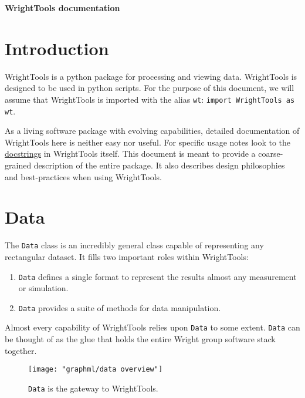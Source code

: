 \documentclass[11pt]{article}
\begin{document}
\begin{flushleft}
	{\Huge \textbf{WrightTools documentation}}
\end{flushleft}

{\let\newpage\relax\begin{spacing}{0.1}\tableofcontents\end{spacing}}
\pagebreak
\listoftodos
\pagebreak

\section{Introduction}

WrightTools is a python package for processing and viewing data. WrightTools is designed to be used in python scripts. For the purpose of this document, we will assume that WrightTools is imported with the alias \texttt{wt}: \texttt{import WrightTools as wt}.


As a living software package with evolving capabilities, detailed documentation of WrightTools here is neither easy nor useful. For specific usage notes look to the \href{https://www.python.org/dev/peps/pep-0257/#what-is-a-docstring}{docstrings} in WrightTools itself. This document is meant to provide a coarse-grained description of the entire package. It also describes design philosophies and best-practices when using WrightTools.

\pagebreak
\section{Data}

The \texttt{Data} class is an incredibly general class capable of representing any rectangular dataset. It fills two important roles within WrightTools:
\begin{enumerate}
	\item \texttt{Data} defines a single format to represent the results almost any measurement or simulation.
	\item \texttt{Data} provides a suite of methods for data manipulation.
\end{enumerate}
Almost every capability of WrightTools relies upon \texttt{Data} to some extent. \texttt{Data} can be thought of as the glue that holds the entire Wright group software stack together.

\begin{figure}[h]\label{fig:data overview}
	\begin{centering}
		\texttt{[image: "graphml/data overview"]}
		\caption{\texttt{Data} is the gateway to WrightTools.}
	\end{centering}
\end{figure}
\end{document}
